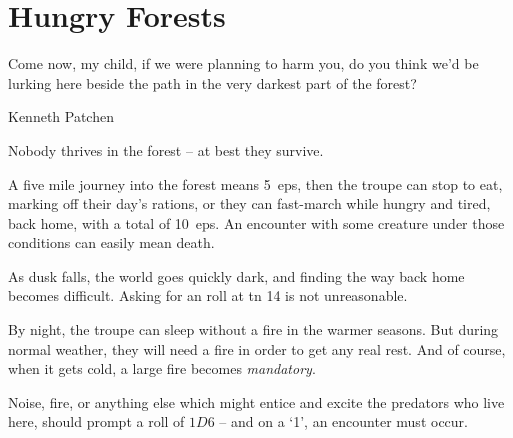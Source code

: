 \chapter{Hungry Forests}
\epigraph{Come now, my child, if we were planning to harm you, do you think we'd be lurking here beside the path in the very darkest part of the forest?}{Kenneth Patchen}

\noindent
Nobody thrives in the forest -- at best they survive.

A five mile journey into the forest means 5~\glspl{ep}, then the troupe can stop to eat, marking off their day's rations, or they can fast-march while hungry and tired, back home, with a total of 10~\glspl{ep}.
An encounter with some creature under those conditions can easily mean death.

As dusk falls, the world goes quickly dark, and finding the way back home becomes difficult.
Asking for an  roll at \gls{tn} 14 is not unreasonable.

By night, the troupe can sleep without a fire in the warmer seasons.
But during normal weather, they will need a fire in order to get any real rest.
And of course, when it gets cold, a large fire becomes \emph{mandatory}.

Noise, fire, or anything else which might entice and excite the predators who live here, should prompt a roll of $1D6$ -- and on a `1', an encounter must occur.
